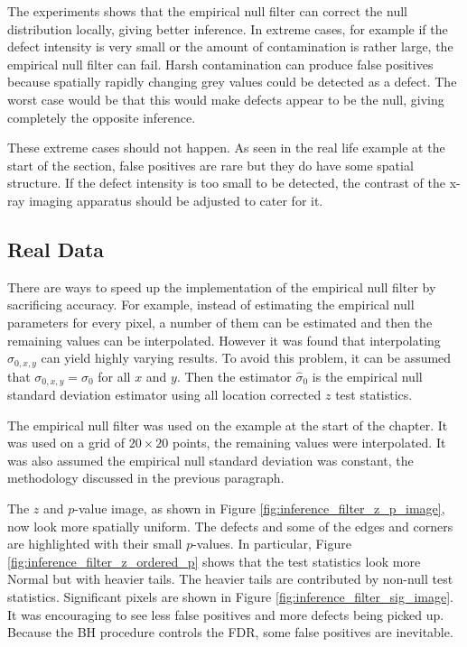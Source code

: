 The experiments shows that the empirical null filter can correct the null distribution locally, giving better inference. In extreme cases, for example if the defect intensity is very small or the amount of contamination is rather large, the empirical null filter can fail. Harsh contamination can produce false positives because spatially rapidly changing grey values could be detected as a defect. The worst case would be that this would make defects appear to be the null, giving completely the opposite inference.

These extreme cases should not happen. As seen in the real life example at the start of the section, false positives are rare but they do have some spatial structure. If the defect intensity is too small to be detected, the contrast of the x-ray imaging apparatus should be adjusted to cater for it.

\subsection{Real Data}

There are ways to speed up the implementation of the empirical null filter by sacrificing accuracy. For example, instead of estimating the empirical null parameters for every pixel, a number of them can be estimated and then the remaining values can be interpolated. However it was found that interpolating $\widehat{\sigma}_{0,x,y}$ can yield highly varying results. To avoid this problem, it can be assumed that $\sigma_{0,x,y}=\sigma_0$ for all $x$ and $y$. Then the estimator $\widehat{\sigma}_0$ is the empirical null standard deviation estimator using all location corrected $z$ test statistics.

The empirical null filter was used on the example at the start of the chapter. It was used on a grid of $20\times 20$ points, the remaining values were interpolated. It was also assumed the empirical null standard deviation was constant, the methodology discussed in the previous paragraph.

The $z$ and $p$-value image, as shown in Figure \ref{fig:inference_filter_z_p_image}, now look more spatially uniform. The defects and some of the edges and corners are highlighted with their small $p$-values. In particular, Figure \ref{fig:inference_filter_z_ordered_p} shows that the test statistics look more Normal but with heavier tails. The heavier tails are contributed by non-null test statistics. Significant pixels are shown in Figure \ref{fig:inference_filter_sig_image}. It was encouraging to see less false positives and more defects being picked up. Because the BH procedure controls the FDR, some false positives are inevitable.

